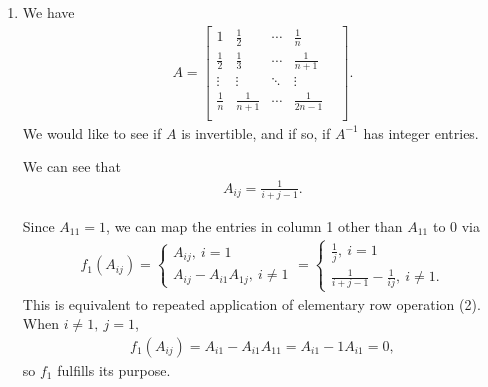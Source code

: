 \documentclass[12pt]{article}
\begin{document}
\begin{enumerate}
  \item
    We have
    \begin{align*}
      A =
      \begin{bmatrix}
        1 &
        \frac{1}{2} &
        \cdots &
        \frac{1}{n}\\
        \frac{1}{2} &
        \frac{1}{3} &
        \cdots &
        \frac{1}{n + 1}\\
        \vdots &
        \vdots &
        \ddots &
        \vdots &\\
        \frac{1}{n} &
        \frac{1}{n + 1} &
        \cdots &
        \frac{1}{2n - 1}\\
      \end{bmatrix}.
    \end{align*}
    We would like to see if $A$ is invertible, and if so, if
    $A^{-1}$ has integer entries.

    We can see that
    \begin{align*}
      A_{ij} = \frac{1}{i + j - 1}.
    \end{align*}

    Since $A_{11} = 1$, we can map the entries in column 1 other
    than $A_{11}$ to 0 via
    \begin{align*}
      f_1(A_{ij}) =
      \begin{cases}
        A_{ij},\ i = 1\\
        A_{ij} - A_{i1}A_{1j},\ i \neq 1
      \end{cases}
      =
      \begin{cases}
        \frac{1}{j},\ i = 1\\
        \frac{1}{i + j - 1} - \frac{1}{ij},\ i \neq 1.
      \end{cases}
    \end{align*}
    This is equivalent to repeated application of elementary row
    operation (2). When $i \neq 1,\ j = 1$,
    \begin{align*}
      f_1(A_{ij}) = A_{i1} - A_{i1}A_{11} = A_{i1} - 1A_{i1} =
      0,
    \end{align*}
    so $f_1$ fulfills its purpose.


\end{enumerate}
\end{document}
